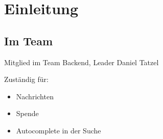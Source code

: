 \section{Einleitung} %
\subsection{Im Team} %

\begin{frame} %
	Mitglied im Team Backend, Leader Daniel Tatzel
	
	Zuständig für:
	\begin{itemize}
	\item Nachrichten
	\item Spende
	\item Autocomplete in der Suche
	\end{itemize}
\end{frame}
